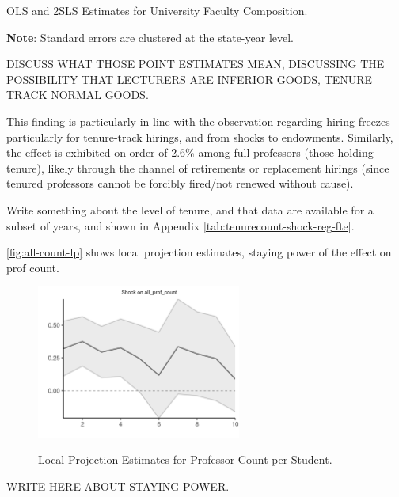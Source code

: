 \documentclass[notitlepage,12pt]{article}
\begin{document}
\begin{table}[!h]
    \onehalfspacing
    \centering
    \caption{OLS and 2SLS Estimates for University Faculty Composition.}
    \makebox[\textwidth][c]{}
    \begin{flushleft}
        \footnotesize
        \textbf{Note}: Standard errors are clustered at the state-year level.
    \end{flushleft}
    \label{tab:facultycount-shock-reg}
\end{table}

DISCUSS WHAT THOSE POINT ESTIMATES MEAN, DISCUSSING THE POSSIBILITY THAT LECTURERS ARE INFERIOR GOODS, TENURE TRACK NORMAL GOODS.


This finding is particularly in line with the \cite{turner2014impact} observation regarding hiring freezes particularly for tenure-track hirings, and \cite{brown2014endowment} from shocks to endowments.
Similarly, the effect is exhibited on order of 2.6\% among full professors (those holding tenure), likely through the channel of retirements or replacement hirings (since tenured professors cannot be forcibly fired/not renewed without cause).

Write something about the level of tenure, and that data are available for a subset of years, and shown in Appendix \autoref{tab:tenurecount-shock-reg-fte}.

\autoref{fig:all-count-lp} shows local projection estimates, staying power of the effect on prof count.

\begin{figure}[h!]
    \centering
    \caption{Local Projection Estimates for Professor Count per Student.}
    \includegraphics[width=0.6\textwidth]{figures/all-count-lp.png}
    \label{fig:all-count-lp}
\end{figure}

WRITE HERE ABOUT STAYING POWER.
\end{document}

